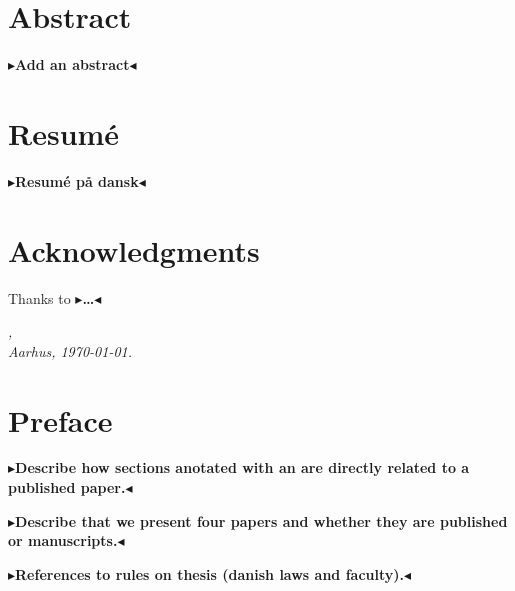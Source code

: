 \documentclass[11pt,a4paper,twoside,openright,final]{memoir}
\makeatletter
\def\ifdraft{\ifdim\overfullrule>\z@
  \expandafter\@firstoftwo\else\expandafter\@secondoftwo\fi}
\newcommand{\todo}[1]{{
    \ifdraft{
        \color[rgb]{.5,0,0}\textbf{
            $\blacktriangleright$#1$\blacktriangleleft$
         }
    }{}}}
\newcommand\contribution[1]{\hspace{0.5em}\hyperref[#1]{\ding{81}}}
\makeatother
\begin{document}
\frontmatter
\cleardoublepage
\chapter*{{\Huge Abstract}}
\todo{Add an abstract}

\cleardoublepage
\chapter*{{\Huge Resum\'e}}

\todo{Resum\'e på dansk}

\cleardoublepage
\chapter*{{\Huge Acknowledgments}}

Thanks to \todo{\dots}

\vspace{2ex}
\begin{flushright}
  \makeatletter\emph{\theauthor,}\makeatother\\
  \emph{Aarhus, \today.}
\end{flushright}

\cleardoublepage
\chapter*{{\Huge Preface}}

\todo{Describe how sections anotated with an \contribution{pap:fid} are directly related to a published paper.}

\todo{Describe that we present four papers and whether they are published or manuscripts.}

\todo{References to rules on thesis (danish laws and faculty).}

\cleardoublepage

\tableofcontents
\cleardoublepage

\mainmatter 

\end{document}
